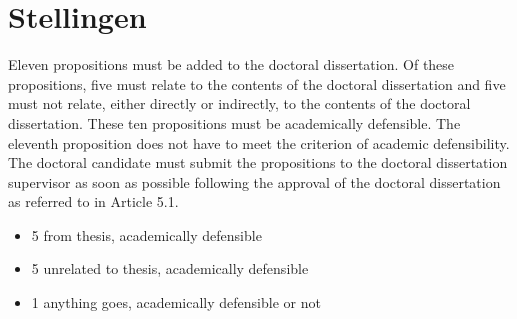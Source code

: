 \chapter*{Stellingen}

Eleven propositions must be added to the doctoral dissertation. Of these propositions,
five must relate to the contents of the doctoral dissertation and five must not relate,
either directly or indirectly, to the contents of the doctoral dissertation. These ten
propositions must be academically defensible. The eleventh proposition does not have
to meet the criterion of academic defensibility. The doctoral candidate must submit the
propositions to the doctoral dissertation supervisor as soon as possible following the
approval of the doctoral dissertation as referred to in Article 5.1.

\begin{itemize}
\item 5 from thesis, academically defensible
\item 5 unrelated to thesis, academically defensible
\item 1 anything goes, academically defensible or not
\end{itemize}

\begin{comment}
ideas

\begin{itemize}
\item This manuscript
    \begin{itemize}
    \item Training is pivotal

    \end{itemize}
\item Academia
    \begin{itemize}
     \item Scientists should write up results for general public as well as scientific journals
     \item Open science FTW, no more paywalled journals. or use money to pay peer reviewers to do thorough testing. or professional reviewers.
     \item Do we even need journals? system of completely open peer review could replace
     \item post-publication public peer review FTW
    \end{itemize}
\end{itemize}
\end{comment}
